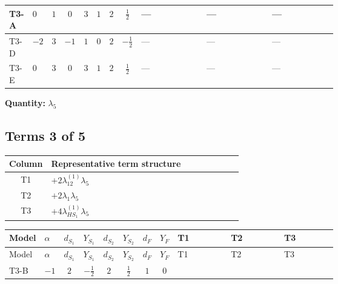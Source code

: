 \documentclass[8pt]{article}
\begin{document}
\begin{landscape}
\begin{longtable}{@{}llcccccc >{\raggedright\arraybackslash}p{0.21\linewidth} >{\raggedright\arraybackslash}p{0.21\linewidth} >{\raggedright\arraybackslash}p{0.21\linewidth}@{}}
\midrule
T3-A & $0$ & $1$ & $0$ & $3$ & $1$ & $2$ & $\frac{1}{2}$ & --- & --- & --- \\
\midrule
T3-D & $-2$ & $3$ & $-1$ & $1$ & $0$ & $2$ & $-\frac{1}{2}$ & --- & --- & --- \\
\midrule
T3-E & $0$ & $3$ & $0$ & $3$ & $1$ & $2$ & $\frac{1}{2}$ & --- & --- & --- \\
\midrule
\bottomrule
\end{longtable}
\clearpage
\noindent\textbf{Quantity: }$\lambda_5$\par\smallskip
\subsection*{Terms 3 of 5}
\begin{center}
\begin{tabular}{@{}c >{\raggedright\arraybackslash}p{0.82\linewidth}@{}}
\toprule
Column & Representative term structure \\
\midrule
T1 & \(\displaystyle +2 {\lambda_{12}^{(1)}} {\lambda_5}\) \\
\midrule
T2 & \(\displaystyle +2 {\lambda_1} {\lambda_5}\) \\
\midrule
T3 & \(\displaystyle +4 {\lambda_{HS_1}^{(1)}} {\lambda_5}\) \\
\midrule
\bottomrule
\end{tabular}
\end{center}
\smallskip
\tiny
\begin{longtable}{@{}llcccccc >{\raggedright\arraybackslash}p{0.21\linewidth} >{\raggedright\arraybackslash}p{0.21\linewidth} >{\raggedright\arraybackslash}p{0.21\linewidth}@{}}
\toprule
Model & $\alpha$ & $d_{S_1}$ & $Y_{S_1}$ & $d_{S_2}$ & $Y_{S_2}$ & $d_F$ & $Y_F$ & T1 & T2 & T3 \\
\midrule
\endfirsthead
\toprule
Model & $\alpha$ & $d_{S_1}$ & $Y_{S_1}$ & $d_{S_2}$ & $Y_{S_2}$ & $d_F$ & $Y_F$ & T1 & T2 & T3 \\
\midrule
\endhead
T3-B & $-1$ & $2$ & $-\frac{1}{2}$ & $2$ & $\frac{1}{2}$ & $1$ & $0$ & \scriptsize\adjustbox{max width=\linewidth}{$\begin{gathered} +2 {\lambda_{12}^{(1)}} {\lambda_5}\end{gathered}$} & \scriptsize\adjustbox{max width=\linewidth}{$\begin{gathered} +2 {\lambda_1} {\lambda_5}\end{gathered}$} & \scriptsize\adjustbox{max width=\linewidth}{$\begin{gathered} +4 {\lambda_{HS_1}^{(1)}} {\lambda_5}\end{gathered}$} \\

\end{longtable}
\end{landscape}
\end{document}
